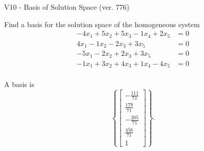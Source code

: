 \begin{exercise}
  \begin{exerciseTitle}V10 - Basis of Solution Space (ver. 776)\end{exerciseTitle}
  \begin{exerciseStatement}
    Find a basis for the solution space of the homogeneous system 
\begin{align*}
 -4 x_ 1 + 5 x_ 2 + 5 x_ 3 -1 x_ 4 + 2 x_ 5 &= 0  \\ 
  4 x_ 1 -1 x_ 2 -2 x_ 3 + 3 x_ 5 &= 0  \\ 
  -5 x_ 1 -2 x_ 2 + 2 x_ 3 + 3 x_ 5 &= 0  \\ 
  -1 x_ 1 + 3 x_ 2 + 4 x_ 3 + 1 x_ 4 -4 x_ 5 &= 0  \\ 
 \end{align*}


 
  \end{exerciseStatement}

  \begin{exerciseAnswer}
   A basis is   
\[\left\{\left[\begin{array}{c}
-\frac{111}{71} \\
\frac{179}{71} \\
-\frac{205}{71} \\
\frac{456}{71} \\
1
\end{array}\right]\right\}.\]

  


  \end{exerciseAnswer}
\end{exercise}